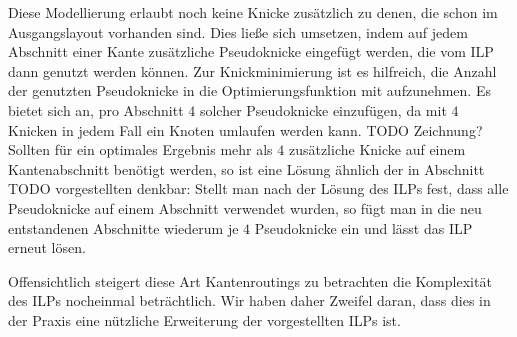 Diese Modellierung erlaubt noch keine Knicke zusätzlich zu denen, die schon im Ausgangslayout vorhanden sind. Dies ließe sich umsetzen, indem auf jedem Abschnitt einer Kante zusätzliche Pseudoknicke eingefügt werden, die vom ILP dann genutzt werden können. Zur Knickminimierung ist es hilfreich, die Anzahl der genutzten Pseudoknicke in die Optimierungsfunktion mit aufzunehmen. Es bietet sich an, pro Abschnitt $4$ solcher Pseudoknicke einzufügen, da mit $4$ Knicken in jedem Fall ein Knoten umlaufen werden kann. TODO Zeichnung? Sollten für ein optimales Ergebnis mehr als $4$ zusätzliche Knicke auf einem Kantenabschnitt benötigt werden, so ist eine Lösung ähnlich der in Abschnitt TODO vorgestellten denkbar: Stellt man nach der Lösung des ILPs fest, dass alle Pseudoknicke auf einem Abschnitt verwendet wurden, so fügt man in die neu entstandenen Abschnitte wiederum je $4$ Pseudoknicke ein und lässt das ILP erneut lösen.

Offensichtlich steigert diese Art Kantenroutings zu betrachten die Komplexität des ILPs nocheinmal beträchtlich. Wir haben daher Zweifel daran, dass dies in der Praxis eine nützliche Erweiterung der vorgestellten ILPs ist.
